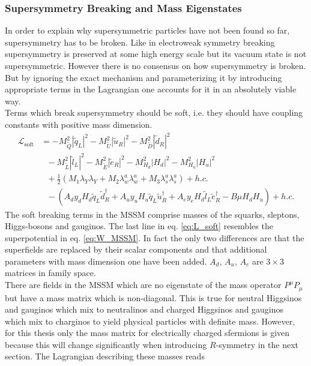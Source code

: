 \subsubsection{Supersymmetry Breaking and Mass Eigenstates}\label{sec:SUSYBreaking}
In order to explain why supersymmetric particles have not been found so far, supersymmetry has to be broken. Like in electroweak symmetry breaking supersymmetry is preserved at some high energy scale but its vacuum state is not supersymmetric. However there is no consensus on how supersymmetry is broken. But by ignoring the exact mechanism and parameterizing it by introducing appropriate terms in the Lagrangian one accounts for it in an absolutely viable way.\\
Terms which break supersymmetry should be soft, i.e. they should have coupling constants with positive mass dimension.
\begin{align}
\mathcal{L}_{\mathrm{soft}} &= -M^2_{\tilde{Q}}|\tilde{q}_L|^2 - M^2_{\tilde{U}}|\tilde{u}_R|^2 - M^2_{\tilde{D}}|\tilde{d}_R|^2 \nonumber\\
&\ \ \ - M^2_{\tilde{L}}|\tilde{l}_L|^2 - M^2_{\tilde{E}}|\tilde{e}_R|^2 - M^2_{H_d}|H_d|^2 - M^2_{H_u}|H_u|^2\nonumber\\
&\ \ \ +\frac{1}{2}\left( M_1 \lambda_Y\lambda_Y + M_2 \lambda_w^a\lambda_w^a + M_3 \lambda_s^a\lambda_s^a\right) + h.c.\nonumber\\
&\ \ \ -\left( A_d y_d H_d \tilde{q}_L \tilde{d}^\dagger_R + A_u y_u H_u \tilde{q}_L \tilde{u}^\dagger_R + A_e y_e H_d \tilde{l}_L \tilde{e}^\dagger_R -B\mu H_d H_u \right) + h.c.\label{eq:L_soft}
\end{align}
The soft breaking terms in the MSSM comprise masses of the squarks, sleptons, Higgs-bosons and gauginos. The last line in eq. \eqref{eq:L_soft} resembles the superpotential in eq. \eqref{eq:W_MSSM}. In fact the only two differences are that the superfields are replaced by their scalar components and that additional parameters with mass dimension one have been added. $A_d$, $A_u$, $A_e$ are $3 \times 3$ matrices in family space.\\
There are fields in the MSSM which are no eigenstate of the mass operator $P^\mu P_\mu$ but have a mass matrix which is non-diagonal. This is true for neutral Higgsinos and gauginos which mix to neutralinos and charged Higgsinos and gauginos which mix to charginos to yield physical particles with definite mass. However, for this thesis only the mass matrix for electrically charged sfermions is given because this will change significantly when introducing $R$-symmetry in the next section. The Lagrangian describing these masses reads
